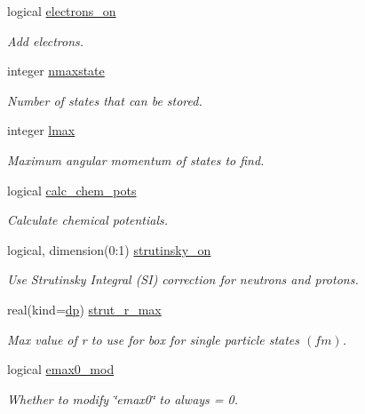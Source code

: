 \begin{DoxyCompactItemize}
logical \mbox{\hyperlink{group__INPUT__PARS_gac0158c8c810d8b150e942815ae3a4478}{electrons\+\_\+on}}
\begin{DoxyCompactList}\small\item\em Add electrons. \end{DoxyCompactList}\item 
integer \mbox{\hyperlink{group__INPUT__PARS_gaa0c2ce3053c1f294c8fe21270389511f}{nmaxstate}}
\begin{DoxyCompactList}\small\item\em Number of states that can be stored. \end{DoxyCompactList}\item 
integer \mbox{\hyperlink{group__INPUT__PARS_gaee5c7e64e0f524d969ac1848094fdbac}{lmax}}
\begin{DoxyCompactList}\small\item\em Maximum angular momentum of states to find. \end{DoxyCompactList}\item 
logical \mbox{\hyperlink{group__INPUT__PARS_ga6e579a9756d3f1c4d2ddc58a161b1f1a}{calc\+\_\+chem\+\_\+pots}}
\begin{DoxyCompactList}\small\item\em Calculate chemical potentials. \end{DoxyCompactList}\item 
logical, dimension(0\+:1) \mbox{\hyperlink{group__INPUT__PARS_gaad3b88a661482173813a2f76cba73b11}{strutinsky\+\_\+on}}
\begin{DoxyCompactList}\small\item\em Use Strutinsky Integral (SI) correction for neutrons and protons. \end{DoxyCompactList}\item 
real(kind=\mbox{\hyperlink{namespaceparameters_a52f8c6351fd79345d8811e065bcbbb37}{dp}}) \mbox{\hyperlink{group__INPUT__PARS_ga0dd8e62aa4b777681ce98d7c88cafdf8}{strut\+\_\+r\+\_\+max}}
\begin{DoxyCompactList}\small\item\em Max value of r to use for box for single particle states $(fm)$. \end{DoxyCompactList}\item 
logical \mbox{\hyperlink{group__INPUT__PARS_gacfc9efb68b340c8246340105af8678e0}{emax0\+\_\+mod}}
\begin{DoxyCompactList}\small\item\em Whether to modify \char`\"{}emax0\char`\"{} to always = 0. \end{DoxyCompactList}\item 

\end{DoxyCompactItemize}

